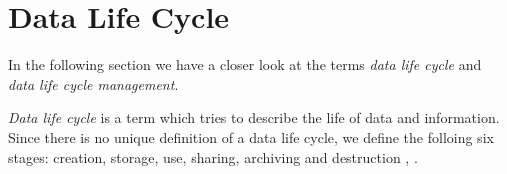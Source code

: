 \section{Data Life Cycle}\label{sec:datalifecycle}


In the following section we have a closer look at the terms \emph{data life cycle} and \emph{data life cycle management}.

\emph{Data life cycle} is a term which tries to describe the life of data and information. Since there is no unique definition of a data life cycle, we define the folloing six stages: creation, storage, use, sharing, archiving and destruction  \cite{marburg}, \cite{spirion}.

